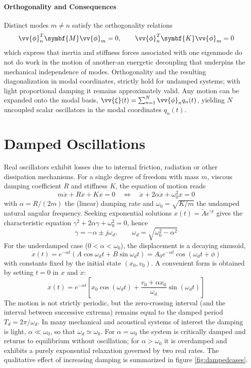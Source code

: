 \paragraph{Orthogonality and Consequences} Distinct modes \( m\neq n \) satisfy the orthogonality relations
\[
\vv{\phi}_n^{T} \symbf{M} \vv{\phi}_m = 0,
\qquad
\vv{\phi}_n^{T} \symbf{K} \vv{\phi}_m = 0
\]
which express that inertia and stiffness forces associated with one eigenmode do not do work in the motion of another-an energetic decoupling that underpins the mechanical independence of modes. Orthogonality and the resulting diagonalization in modal coordinates, strictly hold for undamped systems; with light proportional damping it remains approximately valid. Any motion can be expanded onto the modal basis, \( \vv{\xi}(t) = \sum_{n = 1}^{N} \vv{\phi}_nq_n(t) \), yielding \( N \) uncoupled scalar oscillators in the modal coordinates \( q_n(t) \).

\section{Damped Oscillations}

Real oscillators exhibit losses due to internal friction, radiation or other dissipation mechanisms. For a single degree of freedom with mass \( m \), viscous damping coefficient \( R \) and stiffness \( K \), the equation of motion reads
\[
m \ddot{x} + R \dot{x} + K x = 0
\quad \Longleftrightarrow \quad
\ddot{x} + 2 \alpha \dot{x} + \omega_0^{2} x = 0
\]
with \( \alpha = R/(2m) \) the (linear) damping rate and \( \omega_0 = \sqrt{K/m} \) the undamped natural angular frequency. Seeking exponential solutions \( x(t) = \widetilde{A} e^{\gamma t} \) gives the characteristic equation \( \gamma^{2} + 2 \alpha \gamma + \omega_0^{2} = 0 \), hence
\[
\gamma = - \alpha \pm j \omega_d,
\qquad
\omega_d = \sqrt{\omega_0^{2} - \alpha^{2}}
\]
For the underdamped case (\( 0 < \alpha < \omega_0 \)), the displacement is a decaying sinusoid,
\[
x(t) = e^{ - \alpha t} \left( A \cos \omega_d t + B \sin \omega_d t \right)
 = A_0 e^{ - \alpha t} \cos \left( \omega_d t + \phi \right)
\]
with constants fixed by the initial state \( (x_0,v_0) \). A convenient form is obtained by setting \( t = 0 \) in \( x \) and \( \dot{x} \):
\[
x(t) = e^{ - \alpha t} \left[ x_0 \cos(\omega_d t) + \frac{v_0 + \alpha x_0}{\omega_d} \sin(\omega_d t) \right]
\]
The motion is not strictly periodic, but the zero-crossing interval (and the interval between successive extrema) remains equal to the damped period \( T_d = 2\pi/\omega_d \). In many mechanical and acoustical systems of interest the damping is light, \( \alpha \ll \omega_0 \), so that \( \omega_d\simeq\omega_0 \). For \( \alpha = \omega_0 \) the system is critically damped and returns to equilibrium without oscillation; for \( \alpha > \omega_0 \) it is overdamped and exhibits a purely exponential relaxation governed by two real rates. The qualitative effect of increasing damping is summarized in figure \ref{fig:dampedcases}.


